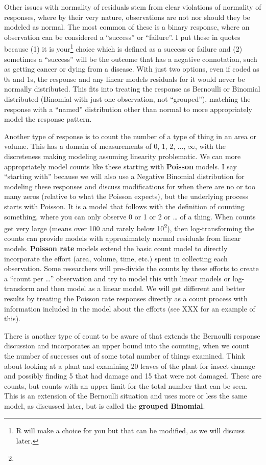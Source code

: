 \documentclass[
]{book}
\begin{document}
Other issues with normality of residuals stem from clear violations of normality of responses, where by their very nature, observations are not nor should they be modeled as normal. The most common of these is a binary response, where an observation can be considered a ``success'' or ``failure''. I put these in quotes because (1) it is your\footnote{R will make a choice for you but that can be modified, as we will discuss later.} choice which is defined as a success or failure and (2) sometimes a ``success'' will be the outcome that has a negative connotation, such as getting cancer or dying from a disease. With just two options, even if coded as 0s and 1s, the response and any linear models residuals for it would never be normally distributed. This fits into treating the response as Bernoulli or Binomial distributed (Binomial with just one observation, not ``grouped''), matching the response with a ``named'' distribution other than normal to more appropriately model the response pattern.

Another type of response is to count the number of a type of thing in an area or volume. This has a domain of measurements of 0, 1, 2, \(\dots\), \(\infty\), with the discreteness making modeling assuming linearity problematic. We can more appropriately model counts like these starting with \textbf{Poisson} models. I say ``starting with'' because we will also use a Negative Binomial distribution for modeling these responses and discuss modifications for when there are no or too many zeros (relative to what the Poisson expects), but the underlying process starts with Poisson. It is a model that follows with the definition of counting something, where you can only observe 0 or 1 or 2 or \ldots{} of a thing. When counts get very large (means over 100 and rarely below 10\footnote{}), then log-transforming the counts can provide models with approximately normal residuals from linear models. \textbf{Poisson rate} models extend the basic count model to directly incorporate the effort (area, volume, time, etc.) spent in collecting each observation. Some researchers will pre-divide the counts by these efforts to create a ``count per \ldots{}'' observation and try to model this with linear models or log-transform and then model as a linear model. We will get different and better results by treating the Poisson rate responses directly as a count process with information included in the model about the efforts (see XXX for an example of this).

There is another type of count to be aware of that extends the Bernoulli response discussion and incorporates an upper bound into the counting, when we count the number of successes out of some total number of things examined. Think about looking at a plant and examining 20 leaves of the plant for insect damage and possibly finding 5 that had damage and 15 that were not damaged. These are counts, but counts with an upper limit for the total number that can be seen. This is an extension of the Bernoulli situation and uses more or less the same model, as discussed later, but is called the \textbf{grouped Binomial}.
\end{document}
